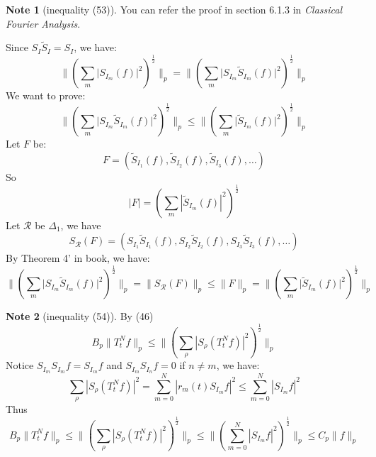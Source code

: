 \documentclass{report}
\theoremstyle{definition}
\newtheorem{note}{Note}
\theoremstyle{definition}
\theoremstyle{plain}
\numberwithin{theorem}{section}
\numberwithin{remark}{section}
\numberwithin{equation}{section}
\newcommand{\norm}[1]{\lVert#1\rVert}
\newcommand{\abs}[1]{\left\lvert#1\right\rvert}
\newcommand{\absl}[1]{\lvert#1\rvert}
\begin{document}
\begin{note}[inequality (53)]
    You can refer the proof in section 6.1.3 in \emph{Classical Fourier Analysis}.\par
   Since $S_I\tilde{S}_I=S_I$, we have:
    \begin{equation*}
        \norm{( \sum_m\absl{{S}_{I_m}(f)}^2 )^\frac{1}{2}}_p=\norm{( \sum_m\absl{S_{I_m}\tilde{S}_{I_m}(f)}^2 )^\frac{1}{2}}_p
    \end{equation*}
    We want to prove:
    \begin{equation*}
        \norm{( \sum_m\absl{S_{I_m}\tilde{S}_{I_m}(f)}^2 )^\frac{1}{2}}_p\leq \norm{( \sum_m\absl{\tilde{S}_{I_m}(f)}^2 )^\frac{1}{2}}_p
    \end{equation*}
    Let $F$ be:
    \begin{equation*}
        F=(\tilde{S}_{I_1}(f),\tilde{S}_{I_2}(f),\tilde{S}_{I_3}(f),\dots)
    \end{equation*}
    So 
    \begin{equation*}
        \abs{F}=(\sum_m\abs{\tilde{S}_{I_m}(f)}^2)^\frac{1}{2}    
    \end{equation*}
    Let $\mathscr{R}$ be $\Delta_1$, we have
    \begin{equation*}
        S_{\mathscr{R}}(F)=(S_{I_1}\tilde{S}_{I_1}(f),S_{I_2}\tilde{S}_{I_2}(f),S_{I_3}\tilde{S}_{I_3}(f),\dots)
    \end{equation*}
    By Theorem 4' in book, we have:
    \begin{equation*}
        \norm{( \sum_m\absl{S_{I_m}\tilde{S}_{I_m}(f)}^2 )^\frac{1}{2}}_p=\norm{S_{\mathscr{R}}(F)}_p\leq \norm{F}_p=\norm{( \sum_m\absl{\tilde{S}_{I_m}(f)}^2 )^\frac{1}{2}}_p
    \end{equation*}
\end{note}
\begin{note}[inequality (54)]
    By (46)
    \begin{equation*}
        B_p\norm{T_t^Nf}_p\leq\norm{(\sum_\rho \abs{S_\rho (T_t^Nf)}^2)^\frac{1}{2}}_p
    \end{equation*}
    Notice $S_{I_m}S_{I_m}f=S_{I_m}f$ and $S_{I_m}S_{I_n}f=0$ if $n\neq m$, we have:
    \begin{equation*}
        \sum_\rho \abs{S_\rho (T_t^Nf)}^2= \sum_{m=0}^N \abs{r_m(t)S_{I_m}f}^2\leq\sum_{m=0}^N \abs{S_{I_m}f}^2
    \end{equation*}
    Thus
    \begin{equation*}
        B_p\norm{T_t^Nf}_p\leq\norm{(\sum_\rho \abs{S_\rho (T_t^Nf)}^2)^\frac{1}{2}}_p\leq\norm{(\sum_{m=0}^N \abs{S_{I_m}f}^2)^\frac{1}{2}}_p\leq C_p\norm{f}_p
    \end{equation*}
\end{note}
\end{document}
